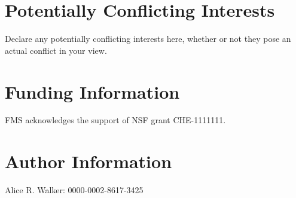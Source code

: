 \documentclass[9pt,review]{livecoms}
\begin{document}
\section*{Potentially Conflicting Interests}

Declare any potentially conflicting interests here, whether or not they pose an actual conflict in your view.

\section*{Funding Information}
FMS acknowledges the support of NSF grant CHE-1111111.

\section*{Author Information}
\makeorcid
Alice R. Walker: 0000-0002-8617-3425




\end{document}
